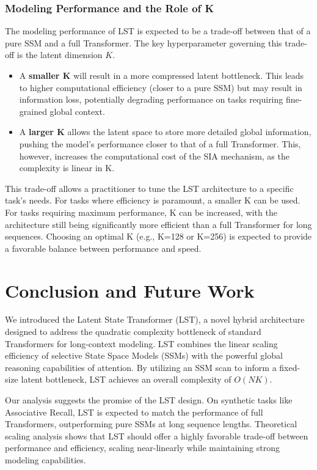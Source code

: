 \documentclass[10pt,twocolumn,letterpaper]{article}
\begin{document}
\subsubsection{Modeling Performance and the Role of K}
The modeling performance of LST is expected to be a trade-off between that of a pure SSM and a full Transformer. The key hyperparameter governing this trade-off is the latent dimension \(K\).
\begin{itemize}
    \item A \textbf{smaller K} will result in a more compressed latent bottleneck. This leads to higher computational efficiency (closer to a pure SSM) but may result in information loss, potentially degrading performance on tasks requiring fine-grained global context.
    \item A \textbf{larger K} allows the latent space to store more detailed global information, pushing the model's performance closer to that of a full Transformer. This, however, increases the computational cost of the SIA mechanism, as the complexity is linear in K.
\end{itemize}
This trade-off allows a practitioner to tune the LST architecture to a specific task's needs. For tasks where efficiency is paramount, a smaller K can be used. For tasks requiring maximum performance, K can be increased, with the architecture still being significantly more efficient than a full Transformer for long sequences. Choosing an optimal K (e.g., K=128 or K=256) is expected to provide a favorable balance between performance and speed.


\section{Conclusion and Future Work}

We introduced the Latent State Transformer (LST), a novel hybrid architecture designed to address the quadratic complexity bottleneck of standard Transformers for long-context modeling. LST combines the linear scaling efficiency of selective State Space Models (SSMs) with the powerful global reasoning capabilities of attention. By utilizing an SSM scan to inform a fixed-size latent bottleneck, LST achieves an overall complexity of \(O(NK)\).

Our analysis suggests the promise of the LST design. On synthetic tasks like Associative Recall, LST is expected to match the performance of full Transformers, outperforming pure SSMs at long sequence lengths. Theoretical scaling analysis shows that LST should offer a highly favorable trade-off between performance and efficiency, scaling near-linearly while maintaining strong modeling capabilities.
\end{document}
